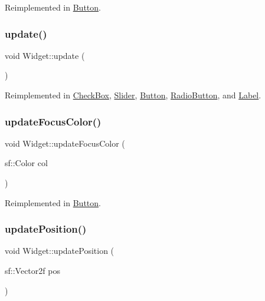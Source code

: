 Reimplemented in \mbox{\hyperlink{class_button_a16df47cdbf999b65b5c9965650970f12}{Button}}.

\mbox{\label{class_widget_a38aacc92bda1a1e91052873a4a955487}} 
\subsubsection{\texorpdfstring{update()}{update()}}
{\footnotesize\ttfamily void Widget\+::update (\begin{DoxyParamCaption}{ }\end{DoxyParamCaption})\hspace{0.3cm}{\ttfamily [virtual]}}



Reimplemented in \mbox{\hyperlink{class_check_box_a02e3ede9dd393fd232f1655205a3c51a}{Check\+Box}}, \mbox{\hyperlink{class_slider_a4ebd527db54ea263c7d0efe4d1f94e1b}{Slider}}, \mbox{\hyperlink{class_button_abda97f1ae8e081da3dbd0b77a27cad9d}{Button}}, \mbox{\hyperlink{class_radio_button_add936c8d72748870cdb8f8d0416e8068}{Radio\+Button}}, and \mbox{\hyperlink{class_label_a736aab0e4b280f1a3c86e1566b5eb235}{Label}}.

\mbox{\label{class_widget_aef48b79ed822a3ad4e5a2b719e57f350}} 
\subsubsection{\texorpdfstring{updateFocusColor()}{updateFocusColor()}}
{\footnotesize\ttfamily void Widget\+::update\+Focus\+Color (\begin{DoxyParamCaption}\item[{sf\+::\+Color}]{col }\end{DoxyParamCaption})\hspace{0.3cm}{\ttfamily [virtual]}}



Reimplemented in \mbox{\hyperlink{class_button_a2b0211c37e877b51695b62a680b1d82a}{Button}}.

\mbox{\label{class_widget_a49b72dfbd65f07a616d6e33b04675b9a}} 
\subsubsection{\texorpdfstring{updatePosition()}{updatePosition()}}
{\footnotesize\ttfamily void Widget\+::update\+Position (\begin{DoxyParamCaption}\item[{sf\+::\+Vector2f}]{pos }\end{DoxyParamCaption})\hspace{0.3cm}{\ttfamily [virtual]}}



